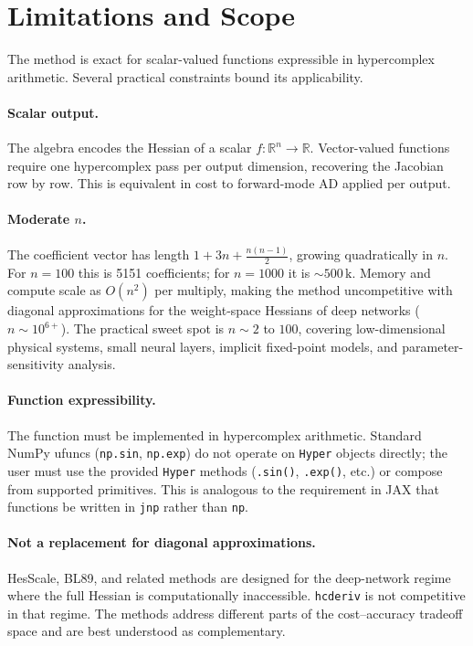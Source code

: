 
\section{Limitations and Scope}

The method is exact for scalar-valued functions expressible in hypercomplex
arithmetic. Several practical constraints bound its applicability.

\paragraph{Scalar output.}
The algebra encodes the Hessian of a scalar $f:\mathbb{R}^n \to \mathbb{R}$.
Vector-valued functions require one hypercomplex pass per output dimension, recovering
the Jacobian row by row. This is equivalent in cost to forward-mode AD applied per
output.

\paragraph{Moderate $n$.}
The coefficient vector has length $1 + 3n + \frac{n(n-1)}{2}$, growing quadratically
in $n$. For $n = 100$ this is 5151 coefficients; for $n = 1000$ it is $\sim\!500\,\mathrm{k}$.
Memory and compute scale as $O(n^2)$ per multiply, making the method uncompetitive
with diagonal approximations for the weight-space Hessians of deep networks
($n \sim 10^{6+}$). The practical sweet spot is $n \sim 2$ to $100$, covering
low-dimensional physical systems, small neural layers, implicit fixed-point models,
and parameter-sensitivity analysis.

\paragraph{Function expressibility.}
The function must be implemented in hypercomplex arithmetic. Standard NumPy ufuncs
(\texttt{np.sin}, \texttt{np.exp}) do not operate on \texttt{Hyper} objects directly;
the user must use the provided \texttt{Hyper} methods (\texttt{.sin()},
\texttt{.exp()}, etc.) or compose from supported primitives. This is analogous to the
requirement in JAX that functions be written in \texttt{jnp} rather than \texttt{np}.

\paragraph{Not a replacement for diagonal approximations.}
HesScale, BL89, and related methods are designed for the deep-network regime where the
full Hessian is computationally inaccessible. \texttt{hcderiv} is not competitive in
that regime. The methods address different parts of the cost--accuracy tradeoff space
and are best understood as complementary.

